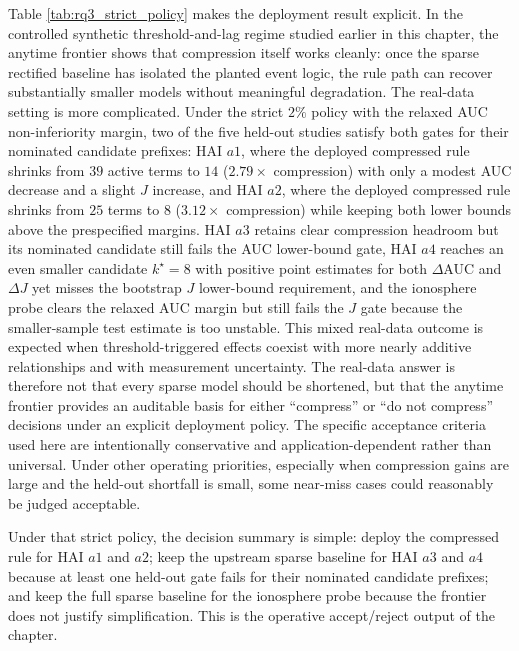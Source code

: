 Table \ref{tab:rq3_strict_policy} makes the deployment result explicit. In the controlled synthetic threshold-and-lag regime studied earlier in this chapter, the anytime frontier shows that compression itself works cleanly: once the sparse rectified baseline has isolated the planted event logic, the rule path can recover substantially smaller models without meaningful degradation. The real-data setting is more complicated. Under the strict $2\%$ policy with the relaxed AUC non-inferiority margin, two of the five held-out studies satisfy both gates for their nominated candidate prefixes: HAI $a1$, where the deployed compressed rule shrinks from $39$ active terms to $14$ ($2.79\times$ compression) with only a modest AUC decrease and a slight $J$ increase, and HAI $a2$, where the deployed compressed rule shrinks from $25$ terms to $8$ ($3.12\times$ compression) while keeping both lower bounds above the prespecified margins. HAI $a3$ retains clear compression headroom but its nominated candidate still fails the AUC lower-bound gate, HAI $a4$ reaches an even smaller candidate $k^\star=8$ with positive point estimates for both $\Delta$AUC and $\Delta J$ yet misses the bootstrap $J$ lower-bound requirement, and the ionosphere probe clears the relaxed AUC margin but still fails the $J$ gate because the smaller-sample test estimate is too unstable. This mixed real-data outcome is expected when threshold-triggered effects coexist with more nearly additive relationships and with measurement uncertainty. The real-data answer is therefore not that every sparse model should be shortened, but that the anytime frontier provides an auditable basis for either ``compress'' or ``do not compress'' decisions under an explicit deployment policy. The specific acceptance criteria used here are intentionally conservative and application-dependent rather than universal. Under other operating priorities, especially when compression gains are large and the held-out shortfall is small, some near-miss cases could reasonably be judged acceptable.

Under that strict policy, the decision summary is simple: deploy the compressed rule for HAI $a1$ and $a2$; keep the upstream sparse baseline for HAI $a3$ and $a4$ because at least one held-out gate fails for their nominated candidate prefixes; and keep the full sparse baseline for the ionosphere probe because the frontier does not justify simplification. This is the operative accept/reject output of the chapter.

